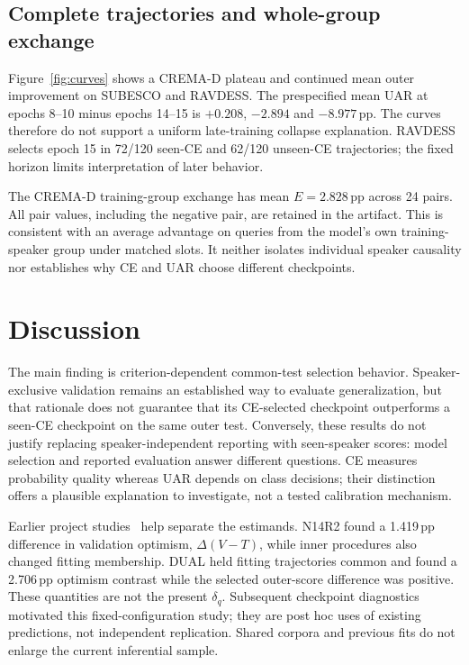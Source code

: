 \documentclass[letterpaper]{article}
\begin{document}
\subsection{Complete trajectories and whole-group exchange}
Figure~\ref{fig:curves} shows a CREMA-D plateau and continued mean outer improvement on SUBESCO and RAVDESS. The prespecified mean UAR at epochs 8--10 minus epochs 14--15 is $+0.208$, $-2.894$ and $-8.977$\,pp. The curves therefore do not support a uniform late-training collapse explanation. RAVDESS selects epoch 15 in 72/120 seen-CE and 62/120 unseen-CE trajectories; the fixed horizon limits interpretation of later behavior.

The CREMA-D training-group exchange has mean $E=2.828$\,pp across 24 pairs. All pair values, including the negative pair, are retained in the artifact. This is consistent with an average advantage on queries from the model's own training-speaker group under matched slots. It neither isolates individual speaker causality nor establishes why CE and UAR choose different checkpoints.

\section{Discussion}
The main finding is criterion-dependent common-test selection behavior. Speaker-exclusive validation remains an established way to evaluate generalization, but that rationale does not guarantee that its CE-selected checkpoint outperforms a seen-CE checkpoint on the same outer test. Conversely, these results do not justify replacing speaker-independent reporting with seen-speaker scores: model selection and reported evaluation answer different questions. CE measures probability quality whereas UAR depends on class decisions; their distinction offers a plausible explanation to investigate, not a tested calibration mechanism.

Earlier project studies~\cite{artifact} help separate the estimands. N14R2 found a 1.419\,pp difference in validation optimism, $\Delta(V-T)$, while inner procedures also changed fitting membership. DUAL held fitting trajectories common and found a 2.706\,pp optimism contrast while the selected outer-score difference was positive. These quantities are not the present $\delta_q$. Subsequent checkpoint diagnostics motivated this fixed-configuration study; they are post hoc uses of existing predictions, not independent replication. Shared corpora and previous fits do not enlarge the current inferential sample.
\end{document}
